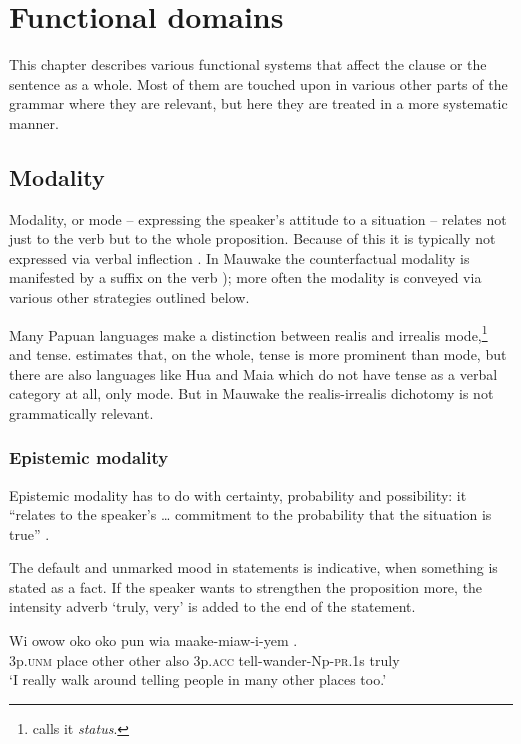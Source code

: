 
\chapter{Functional domains}
{}
This chapter describes various functional systems that affect the clause or the sentence as a whole.  Most of them are touched upon in various other parts of the grammar where they are relevant, but here they are treated in a more systematic manner.

\section{Modality}
{}
Modality, or mode -- expressing the speaker's attitude to a situation -- relates not just to the verb but to the whole proposition. Because of this it is typically not expressed via verbal inflection \citep[22]{Bybee1985}.  In Mauwake the counterfactual modality is manifested by a suffix on the verb 
); more often the modality is conveyed via various other strategies outlined below.

Many Papuan languages make a distinction between realis and irrealis mode,\footnote{\citet[158]{Foley1986} calls it \textit{status}.} and tense. \citet[162]{Foley1986} estimates that, on the whole, tense is more prominent than mode, but there are also languages like Hua \citep{Haiman1980} and Maia \citep{Hardin2002} which do not have tense as a verbal category at all, only mode. But in Mauwake the realis-irrealis dichotomy is not grammatically relevant. 

\subsection{Epistemic modality}
{}
Epistemic modality has to do with certainty, probability and possibility: it ``relates to the speaker's {\dots} commitment to the probability that the situation is true'' \citep[234]{Payne1997}.  

The default  and unmarked mood in statements is indicative, when something is stated as a fact. If the speaker wants to strengthen the proposition more, the intensity adverb  `truly, very' is added to the end of the statement.

\ea%
\label{ex:x1050}
\gll Wi  owow  oko  oko  pun  wia  maake-miaw-i-yem . \\
3p.\textsc{unm}  place  other  other  also  3p.\textsc{acc}  tell-wander-Np-\textsc{pr}.1s truly\\
\glt `I really walk around telling people in many other places too.'
\z
{}

